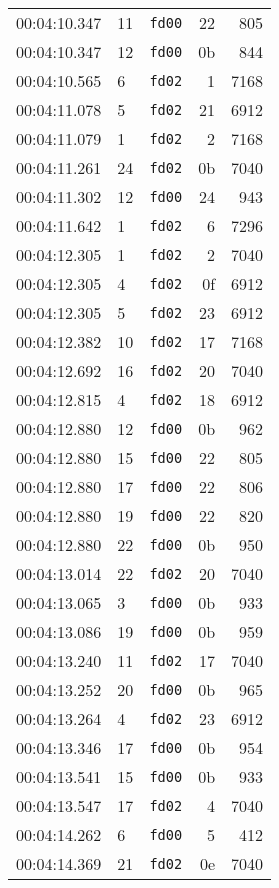 \documentclass{article}
\begin{document}
\begin{longtable}{lllrr}
00:04:10.347 & 11 & \texttt{fd00} & 22 & 805 \\
00:04:10.347 & 12 & \texttt{fd00} & 0b & 844 \\
00:04:10.565 & 6 & \texttt{fd02} & 1 & 7168 \\
00:04:11.078 & 5 & \texttt{fd02} & 21 & 6912 \\
00:04:11.079 & 1 & \texttt{fd02} & 2 & 7168 \\
00:04:11.261 & 24 & \texttt{fd02} & 0b & 7040 \\
00:04:11.302 & 12 & \texttt{fd00} & 24 & 943 \\
00:04:11.642 & 1 & \texttt{fd02} & 6 & 7296 \\
00:04:12.305 & 1 & \texttt{fd02} & 2 & 7040 \\
00:04:12.305 & 4 & \texttt{fd02} & 0f & 6912 \\
00:04:12.305 & 5 & \texttt{fd02} & 23 & 6912 \\
00:04:12.382 & 10 & \texttt{fd02} & 17 & 7168 \\
00:04:12.692 & 16 & \texttt{fd02} & 20 & 7040 \\
00:04:12.815 & 4 & \texttt{fd02} & 18 & 6912 \\
00:04:12.880 & 12 & \texttt{fd00} & 0b & 962 \\
00:04:12.880 & 15 & \texttt{fd00} & 22 & 805 \\
00:04:12.880 & 17 & \texttt{fd00} & 22 & 806 \\
00:04:12.880 & 19 & \texttt{fd00} & 22 & 820 \\
00:04:12.880 & 22 & \texttt{fd00} & 0b & 950 \\
00:04:13.014 & 22 & \texttt{fd02} & 20 & 7040 \\
00:04:13.065 & 3 & \texttt{fd00} & 0b & 933 \\
00:04:13.086 & 19 & \texttt{fd00} & 0b & 959 \\
00:04:13.240 & 11 & \texttt{fd02} & 17 & 7040 \\
00:04:13.252 & 20 & \texttt{fd00} & 0b & 965 \\
00:04:13.264 & 4 & \texttt{fd02} & 23 & 6912 \\
00:04:13.346 & 17 & \texttt{fd00} & 0b & 954 \\
00:04:13.541 & 15 & \texttt{fd00} & 0b & 933 \\
00:04:13.547 & 17 & \texttt{fd02} & 4 & 7040 \\
00:04:14.262 & 6 & \texttt{fd00} & 5 & 412 \\
00:04:14.369 & 21 & \texttt{fd02} & 0e & 7040 \\

\end{longtable}
\end{document}
